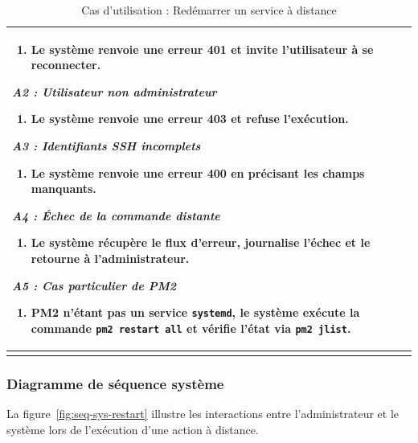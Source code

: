 \begin{longtable}{|p{3.0cm}|>{\raggedright\arraybackslash}p{11.4cm}|}
\begin{enumerate}[leftmargin=*, nosep]
  \item Le système renvoie une erreur 401 et invite l'utilisateur à se reconnecter.
\end{enumerate}
\textit{A2 : Utilisateur non administrateur}
\begin{enumerate}[leftmargin=*, nosep]
  \item Le système renvoie une erreur 403 et refuse l'exécution.
\end{enumerate}
\textit{A3 : Identifiants SSH incomplets}
\begin{enumerate}[leftmargin=*, nosep]
  \item Le système renvoie une erreur 400 en précisant les champs manquants.
\end{enumerate}
\textit{A4 : Échec de la commande distante}
\begin{enumerate}[leftmargin=*, nosep]
  \item Le système récupère le flux d'erreur, journalise l'échec et le retourne à
        l'administrateur.
\end{enumerate}
\textit{A5 : Cas particulier de PM2}
\begin{enumerate}[leftmargin=*, nosep]
  \item PM2 n'étant pas un service \texttt{systemd}, le système exécute la commande
        \texttt{pm2 restart all} et vérifie l'état via \texttt{pm2 jlist}.
\end{enumerate} \\
\hline
\caption{Cas d'utilisation : Redémarrer un service à distance}
\label{tab:cu-restart}
\end{longtable}

\subsubsection*{Diagramme de séquence système}
La figure~\ref{fig:seq-sys-restart} illustre les interactions entre l'administrateur et
le système lors de l'exécution d'une action à distance.

